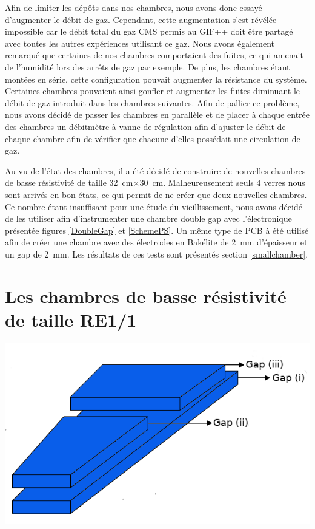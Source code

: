 Afin de limiter les dépôts dans nos chambres, nous avons donc essayé d'augmenter le débit de gaz. Cependant, cette augmentation s'est révélée impossible car le débit total du gaz CMS permis au GIF++ doit être partagé avec toutes les autres expériences utilisant ce gaz.
Nous avons également remarqué que certaines de nos chambres comportaient des fuites, ce qui amenait de l'humidité lors des arrêts de gaz par exemple. De plus, les chambres étant montées en série, cette configuration pouvait augmenter la résistance du système. Certaines chambres pouvaient ainsi gonfler et augmenter les fuites diminuant le débit de gaz introduit dans les chambres suivantes. Afin de pallier ce problème, nous avons décidé de passer les chambres en parallèle et de placer à chaque entrée des chambres un débitmètre à vanne de régulation afin d'ajuster le débit de chaque chambre afin de vérifier que chacune d'elles possédait une circulation de gaz.

Au vu de l'état des chambres, il a été décidé de construire de nouvelles chambres de basse résistivité de taille \SI{32}{\centi\meter}$\times$\SI{30}{\centi\meter}. Malheureusement seuls \num{4} verres nous sont arrivés en bon états, ce qui permit de ne créer que deux nouvelles chambres. Ce nombre étant insuffisant pour une étude du vieillissement, nous avons décidé de les utiliser afin d'instrumenter une chambre double gap avec l'électronique présentée figures \ref{DoubleGap} et \ref{SchemePS}. Un même type de PCB à été utilisé afin de créer une chambre avec des électrodes en Bakélite de \SI{2}{\milli\meter} d'épaisseur et un gap de \SI{2}{\milli\meter}. Les résultats de ces tests sont présentés section \ref{smallchamber}.

\newpage
\section{Les chambres de basse résistivité de taille RE1/1}

\marginpar
{
	\centering
	\includegraphics[width=1.0\marginparwidth]{GLA/gaps.png}
	\label{gap}
}

